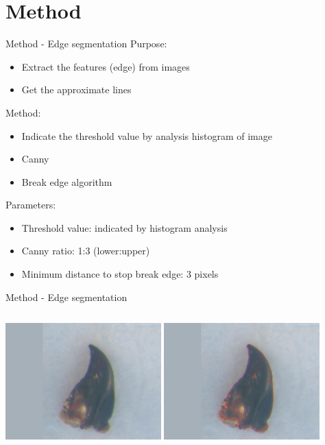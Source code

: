 \documentclass{beamer}
\begin{document}
\section{Method}
\begin{frame}{Method - Edge segmentation}
	Purpose: 
	\begin{itemize}
		\item Extract the features (edge) from images
		\item Get the approximate lines
	\end{itemize}
	Method:
	\begin{itemize}
		\item Indicate the threshold value by analysis histogram of image		
		\item Canny
		\item Break edge algorithm
	\end{itemize}
	Parameters:
	\begin{itemize}
		\item Threshold value: indicated by histogram analysis
		\item Canny ratio: 1:3 (lower:upper)
		\item Minimum distance to stop break edge: 3 pixels
	\end{itemize}
\end{frame}
\begin{frame}{Method - Edge segmentation}
	\begin{columns}[c]
		\includegraphics[height=4.5cm]{images/model28.JPG}
		\includegraphics[height=4.5cm]{images/edge28.jpg}
	\end{columns}
\end{frame}
\end{document}
